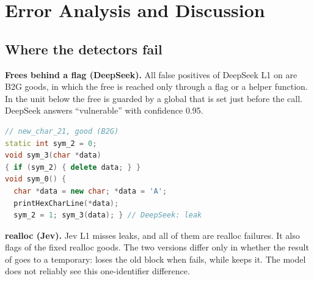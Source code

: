 \section{Error Analysis and Discussion}\label{sec:discussion}

\subsection{Where the detectors fail}\label{sec:errors}

\textbf{Frees behind a flag (DeepSeek).}
All  false positives of DeepSeek L1 on \Deb{} are B2G goods,
in which the free is reached only through a flag or a helper function.
In the unit below the free is guarded by a global that is set just before the call.
DeepSeek answers ``vulnerable'' with confidence 0.95.
\par\noindent\begin{minipage}{\columnwidth}
\begin{lstlisting}[language=C++]
// new_char_21, good (B2G)
static int sym_2 = 0;
void sym_3(char *data)
{ if (sym_2) { delete data; } }
void sym_0() {
  char *data = new char; *data = 'A';
  printHexCharLine(*data);
  sym_2 = 1; sym_3(data); } // DeepSeek: leak
\end{lstlisting}
\end{minipage}\par

\textbf{realloc (Jev).}
Jev L1 misses  leaks, and all of them are realloc failures.
It also flags  of the  fixed realloc goods.
The two versions differ only in whether the result of  goes to a temporary:
 loses the old block when  fails, while  keeps it.
The model does not reliably see this one-identifier difference.


